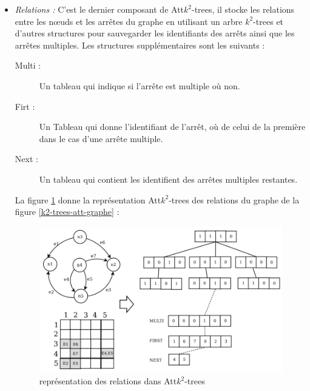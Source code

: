 \begin{itemize}
\item \textit{Relations :} C'est le dernier composant de Att$k^2$-trees, il stocke les relations entre les nœuds et les arrêtes du graphe en utilisant un arbre $k^2$-trees et d'autres structures pour sauvegarder les identifiants des arrêts ainsi que les arrêtes multiples. Les structures supplémentaires sont les suivants \citep{alvarez2018compact}:
\begin{description}
\item[Multi :] Un tableau qui indique si l'arrête est multiple où non.
\item[Firt :] Un Tableau qui donne l'identifiant de l'arrêt, où de celui de la première dans le cas d'une arrête multiple.
\item[Next :] Un tableau qui contient les identifient des arrêtes multiples restantes.
\end{description}
La figure \ref{k2-trees-att-relation} donne la représentation Att$k^2$-trees des relations du graphe de la figure \ref{k2-trees-att-graphe} \citep{alvarez2018compact}:
\begin{figure}[H]
\begin{center}
\includegraphics[height=200 pt, width=280 pt]{./ressources/image/k2-trees-att-relation.png} 
\end{center}
\caption{représentation des relations dans Att$k^2$-trees}
\label{k2-trees-att-relation}
\end{figure} 
\end{itemize}

